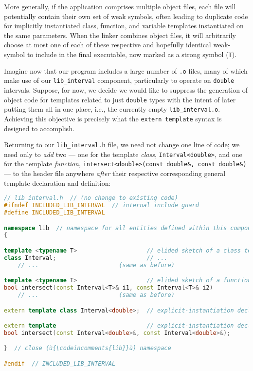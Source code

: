More generally, if the application comprises multiple object files, each
file will potentially contain their own set of weak symbols,
often leading to duplicate code  for implicitly
instantiated class, function, and variable
templates instantiated on the same parameters. When the linker combines
object files, it will arbitrarily choose at most one of each of these
respective and hopefully identical weak-symbol  to
include in the final executable, now marked as a strong symbol
(\lstinline!T!).

Imagine now that our program includes a large number of \lstinline!.o!
files, many of which make use of our \lstinline!lib_interval! component,
particularly to operate on \lstinline!double! intervals. Suppose, for now,
we decide we would like to suppress the generation of object code for
templates related to just \lstinline!double! types with the intent of later putting them all in one place, i.e., the currently
empty \lstinline!lib_interval.o!. Achieving this objective is precisely what the
\lstinline!extern!~\lstinline!template! syntax is designed to accomplish.

Returning to our \lstinline!lib_interval.h! file, we need not change one
line of code; we need only to \emph{add} two
 --- one for the
template \emph{class}, \lstinline!Interval<double>!, and one for the
template \emph{function},
\lstinline!intersect<double>(const!~\lstinline!double&,!~\lstinline!const!~\lstinline!double&)!
--- to the header file anywhere \emph{after} their respective
corresponding general template declaration and definition:

\begin{lstlisting}[language=C++]
// lib_interval.h  // (no change to existing code)
#ifndef INCLUDED_LIB_INTERVAL  // internal include guard
#define INCLUDED_LIB_INTERVAL

namespace lib  // namespace for all entities defined within this component
{

template <typename T>                    // elided sketch of a class template
class Interval;                          // ...
    // ...                       (same as before)

template <typename T>                    // elided sketch of a function template
bool intersect(const Interval<T>& i1, const Interval<T>& i2)
    // ...                       (same as before)

extern template class Interval<double>;  // explicit-instantiation declaration

extern template                          // explicit-instantiation declaration
bool intersect(const Interval<double>&, const Interval<double>&);

}  // close (ù{\codeincomments{lib}}ù) namespace

#endif  // INCLUDED_LIB_INTERVAL
\end{lstlisting}
    
